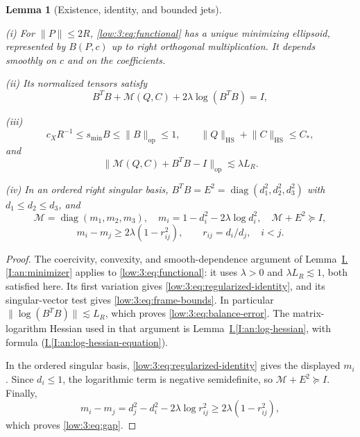 \documentclass[11pt]{amsart}
\newtheorem{lemma}[theorem]{Lemma}
\theoremstyle{definition}
\theoremstyle{remark}
\newcommand{\norm}[1]{\lVert #1\rVert}
\DeclareMathOperator{\diag}{diag}
\numberwithin{equation}{section}
\newcommand{\partIref}[1]{\hyperref[I:#1]{I.\ref*{I:#1}}}
\newcommand{\partIeqref}[1]{\textup{(\partIref{#1})}}
\begin{document}
\begin{lemma}[Existence, identity, and bounded jets]\label{low:3:lem:regularizer}

\noindent\textup{(i)} For $\norm P\leq2R$, \eqref{low:3:eq:functional} has a unique minimizing ellipsoid, represented by $B(P,c)$ up to right orthogonal multiplication. It depends smoothly on $c$ and on the coefficients.

\noindent\textup{(ii)} Its normalized tensors satisfy
\begin{equation}\label{low:3:eq:regularized-identity}
B^TB+\mathscr M(Q,C)+2\lambda\log(B^TB)=I,
\end{equation}

\noindent\textup{(iii)} \begin{equation}\label{low:3:eq:frame-bounds} c_XR^{-1}\leq s_{\min} B\leq\norm B_{\mathrm{op}}\leq1,\qquad \norm Q_{\mathrm{HS}}+\norm C_{\mathrm{HS}}\leq C_*, \end{equation} and
\begin{equation}\label{low:3:eq:balance-error}
\norm{\mathscr M(Q,C)+B^TB-I}_{\mathrm{op}}\lesssim \lambda L_R.
\end{equation}

\noindent\textup{(iv)} In an ordered right singular basis, $B^TB=E^2=\diag(d_1^2,d_2^2,d_3^2)$ with $d_1\leq d_2\leq d_3$, and
\begin{equation}\label{low:3:eq:ordered-moment}
\mathscr M=\diag(m_1,m_2,m_3),\quad m_i=1-d_i^2-2\lambda\log d_i^2,\quad \mathscr M+E^2\succeq I,
\end{equation}
\begin{equation}\label{low:3:eq:gap}
m_i-m_j\geq2\lambda(1-r_{ij}^2),\qquad r_{ij}=d_i/d_j,\quad i<j.
\end{equation}
\end{lemma}

\begin{proof}
The coercivity, convexity, and smooth-dependence argument of Lemma~\partIref{an:minimizer} applies to \eqref{low:3:eq:functional}: it uses $\lambda>0$ and $\lambda L_R\lesssim 1$, both satisfied here. Its first variation gives \eqref{low:3:eq:regularized-identity}, and its singular-vector test gives \eqref{low:3:eq:frame-bounds}. In particular $\|\log(B^TB)\|\lesssim L_R$, which proves \eqref{low:3:eq:balance-error}. The matrix-logarithm Hessian used in that argument is Lemma~\partIref{an:log-hessian}, with formula \partIeqref{an:log-hessian-equation}.

In the ordered singular basis, \eqref{low:3:eq:regularized-identity} gives the displayed $m_i$. Since $d_i\le1$, the logarithmic term is negative semidefinite, so $\mathscr M+E^2\succeq I$. Finally,
\[
m_i-m_j=d_j^2-d_i^2-2\lambda\log r_{ij}^2\ge2\lambda(1-r_{ij}^2),
\]
which proves \eqref{low:3:eq:gap}.
\end{proof}
\end{document}
